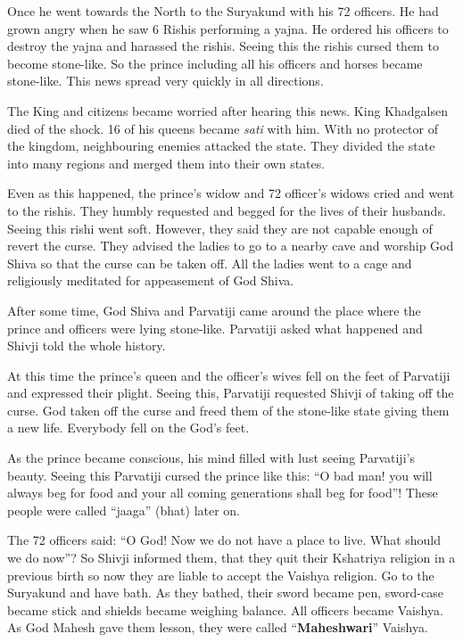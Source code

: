 Once he went towards the North to the Suryakund with his 72 officers. He had grown angry when he saw 6 Rishis performing a yajna. He ordered his officers to destroy the yajna and harassed the rishis. Seeing this the rishis cursed them to become stone-like. So the prince including all his officers and horses became stone-like. This news spread very quickly in all directions.

The King and citizens became worried after hearing this news. King Khadgalsen died of the shock. 16 of his queens became \textit{sati} with him. With no protector of the kingdom, neighbouring enemies attacked the state. They divided the state into many regions and merged them into their own states.

Even as this happened, the prince's widow and 72 officer's widows cried and went to the rishis. They humbly requested and begged for the lives of their husbands. Seeing this rishi went soft. However, they said they are not capable enough of revert the curse. They advised the ladies to go to a nearby cave and worship God Shiva so that the curse can be taken off. All the ladies went to a cage and religiously meditated for appeasement of God Shiva.

After some time, God Shiva and Parvatiji came around the place where the prince and officers were lying stone-like. Parvatiji asked what happened and Shivji told the whole history.

At this time the prince's queen and the officer's wives fell on the feet of Parvatiji and expressed their plight. Seeing this, Parvatiji requested Shivji of taking off the curse. God taken off the curse and freed them of the stone-like state giving them a new life. Everybody fell on the God's feet.

As the prince became conscious, his mind filled with lust seeing Parvatiji's beauty. Seeing this Parvatiji cursed the prince like this: ``O bad man! you will always beg for food and your all coming generations shall beg for food''! These people were called ``jaaga'' (bhat) later on.

The 72 officers said: ``O God! Now we do not have a place to live. What should we do now''? So Shivji informed them, that they quit their Kshatriya religion in a previous birth so now they are liable to accept the Vaishya religion. Go to the Suryakund and have bath. As they bathed, their sword became pen, sword-case became stick and shields became weighing balance. All officers became Vaishya. As God Mahesh gave them lesson, they were called ``\textbf{Maheshwari}'' Vaishya.

